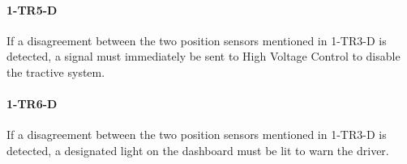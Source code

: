 \paragraph{1-TR5-D}
If a disagreement between the two position sensors mentioned in 1-TR3-D is detected, a signal must immediately be sent to High Voltage Control to disable the tractive system.

\paragraph{1-TR6-D}
If a disagreement between the two position sensors mentioned in 1-TR3-D is detected, a designated light on the dashboard must be lit to warn the driver.

